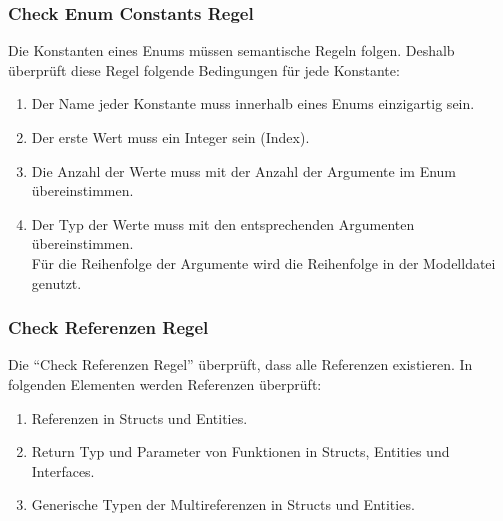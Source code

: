\documentclass[./einleitung.tex]{subfiles}
\begin{document}
    \subsubsection{Check Enum Constants Regel}
    Die Konstanten eines Enums müssen semantische Regeln folgen.
    Deshalb überprüft diese Regel folgende Bedingungen für jede Konstante:
    \begin{enumerate}
        \item Der Name jeder Konstante muss innerhalb eines Enums einzigartig sein.
        \item Der erste Wert muss ein Integer sein (Index).
        \item Die Anzahl der Werte muss mit der Anzahl der Argumente im Enum übereinstimmen.
        \item Der Typ der Werte muss mit den entsprechenden Argumenten übereinstimmen. \\
        Für die Reihenfolge der Argumente wird die Reihenfolge in der Modelldatei genutzt.
    \end{enumerate}

    \subsubsection{Check Referenzen Regel}
    Die ``Check Referenzen Regel'' überprüft, dass alle Referenzen existieren.
    In folgenden Elementen werden Referenzen überprüft:
    \begin{enumerate}
        \item Referenzen in Structs und Entities.
        \item Return Typ und Parameter von Funktionen in Structs, Entities und Interfaces.
        \item Generische Typen der Multireferenzen in Structs und Entities.
    \end{enumerate}
\end{document}
